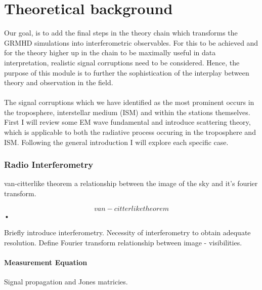 \chapter{Theoretical background}
Our goal, is to add the final steps in the theory chain which transforms the GRMHD simulations into interferometric observables. For this to be achieved and for the theory higher up in the chain to be maximally useful in data interpretation, realistic signal corruptions need to be considered. Hence, the purpose of this module is to further the sophistication of the interplay between theory and observation in the field.\\
~\\
The signal corruptions which we have identified as the most prominent occurs in the troposphere, interstellar medium (ISM) and within the stations themselves. First I will review some EM wave fundamental and introduce scattering theory, which is applicable to both the radiative process occuring in the troposphere and ISM. Following the general introduction I will explore each specific case.\\

\subsection{Radio Interferometry}

van-citterlike theorem a relationship between the image of the sky and it's fourier transform.

\begin{equation}\label{eq:vis_im}

van-citterlike theorem

\end{equation}•


Briefly introduce interferometry. Necessity of interferometry to obtain adequate
resolution.
Define Fourier transform relationship between image - visibilities.


\subsubsection{Measurement Equation}
Signal propagation and Jones matricies.

